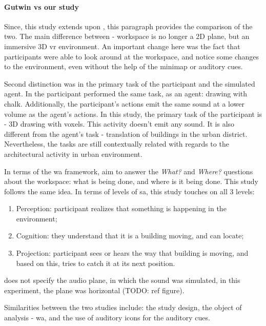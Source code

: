 \paragraph{Gutwin vs our study}
Since, this study extends upon \cite{gutwin_chalk_2011}, this paragraph provides the comparison of the two.
The main difference between - workspace is no longer a 2D plane, but an immersive 3D \gls{vr} environment. An important change here was the fact that participants were able to look around at the workspace, and notice some changes to the environment, even without the help of the minimap or auditory cues. 

Second distinction was in the primary task of the participant and the simulated agent. In \cite{gutwin_chalk_2011} the participant performed the same task, as an agent: drawing with chalk. Additionally, the participant's actions emit the same sound at a lower volume as the agent's actions. In this study, the primary task of the participant is - 3D drawing with voxels. This activity doesn't emit any sound. It is also different from the agent's task - translation of buildings in the urban district. Nevertheless, the tasks are still contextually related with regards to the architectural activity in urban environment.

In terms of the \gls{wa} framework, \cite{gutwin_chalk_2011} aim to answer the \textit{What?} and \textit{Where?} questions about the workspace: what is being done, and where is it being done. This study follows the same idea. In terms of levels of \gls{sa}, this study touches on all 3 levels: 
\begin{enumerate}
	\item Perception: participant realizes that something is happening in the environment;
	\item Cognition: they understand that it is a building moving, and can locate;
	\item Projection: participant sees or hears the way that building is moving, and based on this, tries to catch it at its next position.
\end{enumerate}

\cite{gutwin_chalk_2011} does not specify the audio plane, in which the sound was simulated, in this experiment, the plane was horizontal (TODO: ref figure). 

Similarities between the two studies include: the study design, the object of analysis - \gls{wa}, and the use of auditory icons for the auditory cues.

